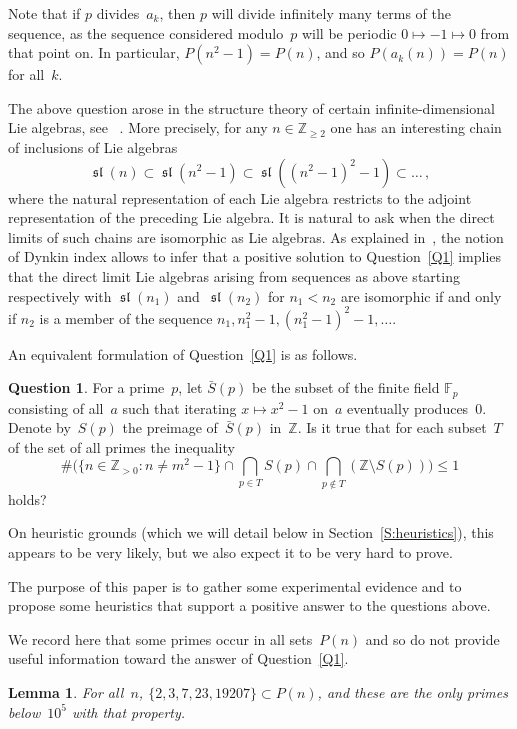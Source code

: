 \documentclass[12pt,a4paper]{amsart}
\newcommand{\Z}{{\mathbb Z}}
\newcommand{\F}{{\mathbb F}}
\renewcommand{\sl}{\operatorname{\mathfrak{sl}}}
\newtheorem{Lemma}[Theorem]{Lemma}
\theoremstyle{definition}
\newtheorem{Question}[Theorem]{Question}
\numberwithin{equation}{section}
\begin{document}
Note that if $p$ divides~$a_k$, then $p$ will divide infinitely many terms of the
sequence, as the sequence considered modulo~$p$ will be periodic $0 \mapsto -1 \mapsto 0$
from that point on. In particular, $P(n^2-1) = P(n)$, and so $P(a_k(n)) = P(n)$ for all~$k$.

The above question arose in the structure theory of certain infinite-dimensional Lie algebras,
see ~\cite{PH}. More precisely, for any $n \in \Z_{\geqslant 2}$ one has an interesting chain
of inclusions of Lie algebras
\[ \sl(n) \subset \sl(n^2-1) \subset \sl((n^2-1)^2-1) \subset \dots \,, \]
where the natural representation of each Lie algebra restricts to the adjoint representation
of the preceding Lie algebra. It is natural to ask when the direct limits of such chains are
isomorphic as Lie algebras. As explained in~\cite{PH}, the notion of Dynkin index allows to infer
that a positive solution to Question~\ref{Q1} implies that the direct limit Lie algebras arising
from sequences as above starting respectively with $\sl(n_1)$ and~$\sl(n_2)$ for $n_1 < n_2$ are
isomorphic if and only if $n_2$ is a member of the sequence $n_1, n_1^2-1, (n_1^2-1)^2-1, \dots$.

An equivalent formulation of Question~\ref{Q1} is as follows.
\begin{Question} \label{Q2}
  For a prime~$p$, let $\bar{S}(p)$ be the subset of the finite field $\F_p$
  consisting of all~$a$ such that iterating $x \mapsto x^2-1$ on~$a$ eventually produces~$0$.
  Denote by~$S(p)$ the preimage of~$\bar{S}(p)$ in~$\Z$.
  Is it true that for each subset~$T$ of the set of all primes the inequality
  \[ \#\bigl(\{n \in \Z_{>0} : n \neq m^2-1\} \cap \bigcap_{p \in T} S(p) \cap \bigcap_{p \notin T} (\Z \setminus S(p))\bigr) \leqslant 1 \]
  holds?
\end{Question}

On heuristic grounds (which we will detail below in Section~\ref{S:heuristics}),
this appears to be very likely, but we also expect it to be very hard to prove.

The purpose of this paper is to gather some experimental evidence and to propose some
heuristics that support a positive answer to the questions above.

We record here that some primes occur in all sets~$P(n)$ and so do not provide
useful information toward the answer of Question~\ref{Q1}.

\begin{Lemma} \label{L:no_info}
  For all~$n$, $\{2, 3, 7, 23, 19207\} \subset P(n)$, and these are the only primes
  below~$10^5$ with that property.
\end{Lemma}
\end{document}
